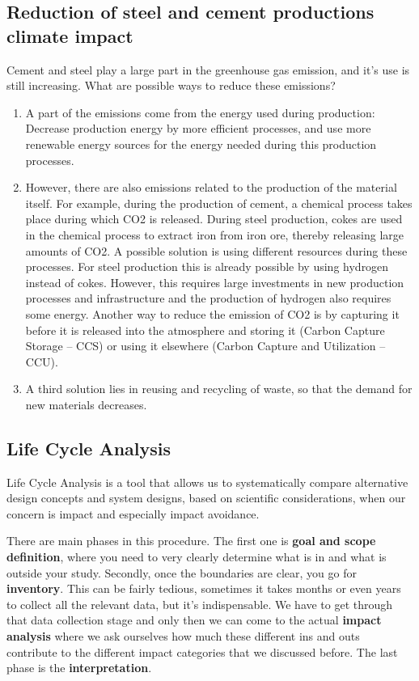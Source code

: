 \documentclass[../summary.tex]{subfiles}
\begin{document}
	\subsection{Reduction of steel and cement productions climate impact}
	
	Cement and steel play a large part in the greenhouse gas emission, and it’s use is still increasing. What are possible ways to reduce these emissions?
	
	\begin{enumerate}
		\item A part of the emissions come from the energy used during production: Decrease production energy by more efficient processes, and use more renewable energy sources for the energy needed during this production processes. 
		\item However, there are also emissions related to the production of the material itself. For example, during the production of cement, a chemical process takes place during which CO2 is released. During steel production, cokes are used in the chemical process to extract iron from iron ore, thereby releasing large amounts of CO2. A possible solution is using different resources during these processes. For steel production this is already possible by using hydrogen instead of cokes. However, this requires large investments in new production processes and infrastructure and the production of hydrogen also requires some energy. Another way to reduce the emission of CO2 is by capturing it before it is released into the atmosphere and storing it (Carbon Capture Storage – CCS) or using it elsewhere (Carbon Capture and Utilization – CCU). 
		\item A third solution lies in reusing and recycling of waste, so that the demand for new materials decreases. 
	
	\end{enumerate}
	
	\subsection{Life Cycle Analysis}
	
	Life Cycle Analysis is a tool that allows us to systematically compare alternative design concepts and system designs, based on scientific considerations, when our concern is impact and especially impact avoidance.
	
	There are main phases in this procedure. The first one is \textbf{goal and scope definition}, where you need to very clearly determine what is in and what is outside your study. Secondly, once the boundaries are clear, you go for \textbf{inventory}. This can be fairly tedious, sometimes it takes months or even years to collect all the relevant data, but it’s indispensable. We have to get through that data collection stage and only then we can come to the actual \textbf{impact analysis} where we ask ourselves how much these different ins and outs contribute to the different impact categories that we discussed before. The last phase is the \textbf{interpretation}.
	
\end{document}
